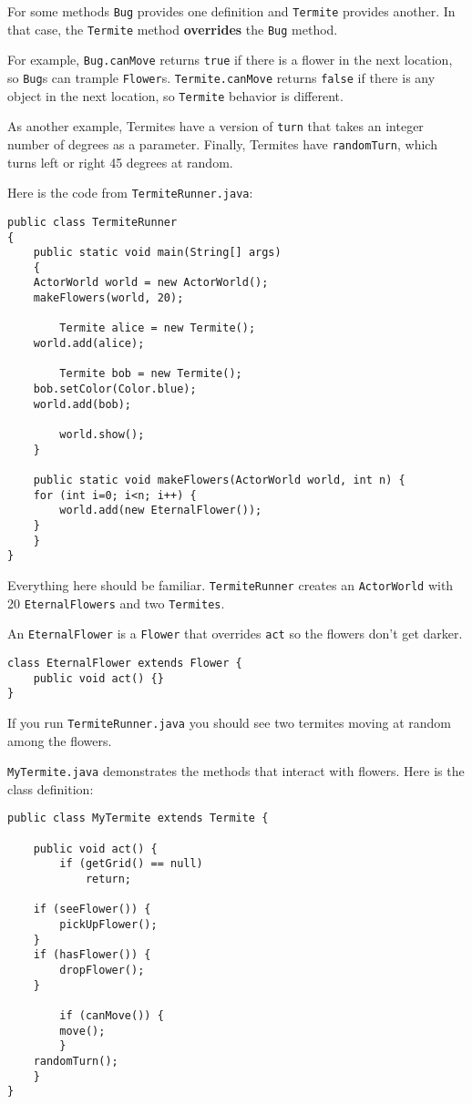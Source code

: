 \documentclass[12pt]{book}
\theoremstyle{definition}
\begin{document}
For some methods {\tt Bug} provides one definition and {\tt Termite}
provides another.  In that case, the {\tt Termite} method 
{\bf overrides} the {\tt Bug} method.

For example, {\tt Bug.canMove}
returns {\tt true} if there is a flower in the next location, so 
{\tt Bug}s can trample {\tt Flower}s.  {\tt Termite.canMove} returns
{\tt false} if there is any object in the next location, so
{\tt Termite} behavior is different.

As another example, Termites have a version of {\tt turn} that takes
an integer number of degrees as a parameter.  Finally, Termites
have {\tt randomTurn}, which turns left or right 45 degrees at random.


Here is the code from {\tt TermiteRunner.java}:

\begin{lstlisting}
public class TermiteRunner
{
    public static void main(String[] args)
    {
	ActorWorld world = new ActorWorld();
	makeFlowers(world, 20);

        Termite alice = new Termite();
	world.add(alice);

        Termite bob = new Termite();
	bob.setColor(Color.blue);
	world.add(bob);

        world.show();
    }

    public static void makeFlowers(ActorWorld world, int n) {
	for (int i=0; i<n; i++) {
	    world.add(new EternalFlower());
	}
    }
}
\end{lstlisting}

Everything here should be familiar.  {\tt TermiteRunner} creates
an {\tt ActorWorld} with 20 {\tt EternalFlowers} and two {\tt Termites}.

An {\tt EternalFlower} is a {\tt Flower} that overrides {\tt act}
so the flowers don't get darker. 

\begin{lstlisting}
class EternalFlower extends Flower {
    public void act() {}
}
\end{lstlisting}

If you run {\tt TermiteRunner.java} you should see two termites
moving at random among the flowers.

{\tt MyTermite.java} demonstrates the methods that interact with
flowers.  Here is the class definition:

\begin{lstlisting}
public class MyTermite extends Termite {

    public void act() {
        if (getGrid() == null)
            return;
	
	if (seeFlower()) {
	    pickUpFlower();
	}
	if (hasFlower()) {
	    dropFlower();
	}

        if (canMove()) {
	    move();
        }
	randomTurn();
    }
}
\end{lstlisting}
\end{document}
